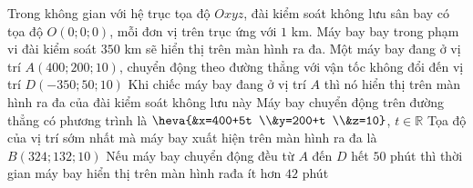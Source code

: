 \begin{ex}%
    Trong không gian với hệ trục tọa độ $Oxyz$, đài kiểm soát không lưu sân bay có tọa độ $O(0;0;0)$, mỗi đơn vị trên trục ứng với $1$ km. Máy bay bay trong phạm vi đài kiểm soát $350$ km sẽ hiển thị trên màn hình ra đa. Một máy bay đang ở vị trí $A(400;200;10)$, chuyển động theo đường thẳng với vận tốc không đổi đến vị trí $D(-350;50;10)$
    \choiceTF
    {Khi chiếc máy bay đang ở vị trí $A$ thì nó hiển thị trên màn hình ra đa của đài kiểm soát không lưu này}
    {\True Máy bay chuyển động trên đường thẳng có phương trình là $\heva{&x=400+5t \\&y=200+t \\&z=10}$, $t\in \mathbb{R}$}
    {Tọa độ của vị trí sớm nhất mà máy bay xuất hiện trên màn hình ra đa là $B(324;132;10)$}
    {Nếu máy bay chuyển động đều từ $A$ đến $D$ hết $50$ phút thì thời gian máy bay hiển thị trên màn hình rađa ít hơn $42$ phút}
\end{ex}
